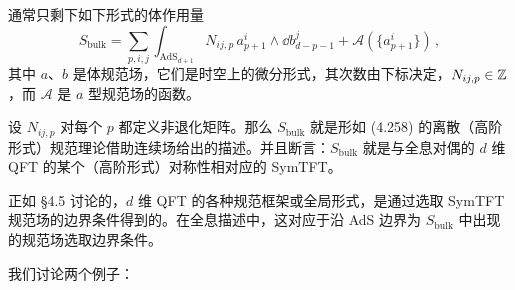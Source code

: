 通常只剩下如下形式的体作用量
\begin{equation}
  S_{\mathrm{bulk}} = \sum_{p,i,j}\int_{\mathrm{AdS}_{d+1}} N_{ij,p}\, a^i_{p+1} \wedge \dd b^j_{d-p-1} + \mathcal{A}\left(\{a^i_{p+1}\}\right)\,, \tag{6.30}
\end{equation}
其中 $a$、$b$ 是体规范场，它们是时空上的微分形式，其次数由下标决定，$N_{ij,p} \in \mathbb{Z}$，而 $\mathcal{A}$ 是 $a$ 型规范场的函数。

设 $N_{ij,p}$ 对每个 $p$ 都定义非退化矩阵。那么 $S_{\mathrm{bulk}}$ 就是形如 (4.258) 的离散（高阶形式）规范理论借助连续场给出的描述。并且断言：$S_{\mathrm{bulk}}$ 就是与全息对偶的 $d$ 维 QFT 的某个（高阶形式）对称性相对应的 SymTFT。


正如 §4.5 讨论的，$d$ 维 QFT 的各种规范框架或全局形式，是通过选取 SymTFT 规范场的边界条件得到的。在全息描述中，这对应于沿 AdS 边界为 $S_{\mathrm{bulk}}$ 中出现的规范场选取边界条件。

我们讨论两个例子：

